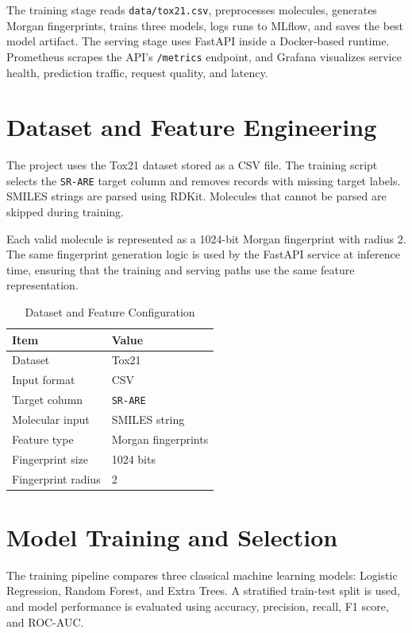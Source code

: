 \documentclass[conference]{IEEEtran}
\begin{document}
The training stage reads \texttt{data/tox21.csv}, preprocesses molecules, generates Morgan fingerprints, trains three models, logs runs to MLflow, and saves the best model artifact. The serving stage uses FastAPI inside a Docker-based runtime. Prometheus scrapes the API's \texttt{/metrics} endpoint, and Grafana visualizes service health, prediction traffic, request quality, and latency.

\section{Dataset and Feature Engineering}
The project uses the Tox21 dataset stored as a CSV file. The training script selects the \texttt{SR-ARE} target column and removes records with missing target labels. SMILES strings are parsed using RDKit. Molecules that cannot be parsed are skipped during training.

Each valid molecule is represented as a 1024-bit Morgan fingerprint with radius 2. The same fingerprint generation logic is used by the FastAPI service at inference time, ensuring that the training and serving paths use the same feature representation.

\begin{table}[H]
\centering
\caption{Dataset and Feature Configuration}
\label{tab:data}
\begin{tabular}{ll}
\toprule
\textbf{Item} & \textbf{Value} \\
\midrule
Dataset & Tox21 \\
Input format & CSV \\
Target column & \texttt{SR-ARE} \\
Molecular input & SMILES string \\
Feature type & Morgan fingerprints \\
Fingerprint size & 1024 bits \\
Fingerprint radius & 2 \\
\bottomrule
\end{tabular}
\end{table}

\section{Model Training and Selection}
The training pipeline compares three classical machine learning models: Logistic Regression, Random Forest, and Extra Trees. A stratified train-test split is used, and model performance is evaluated using accuracy, precision, recall, F1 score, and ROC-AUC.
\end{document}
